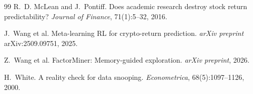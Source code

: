 \documentclass[11pt]{article}
\begin{document}
\begin{thebibliography}{99}
R.~D. McLean and J.~Pontiff.
\newblock Does academic research destroy stock return predictability?
\newblock \emph{Journal of Finance}, 71(1):5--32, 2016.

J.~Wang et al.
\newblock Meta-learning RL for crypto-return prediction.
\newblock \emph{arXiv preprint} arXiv:2509.09751, 2025.

Z.~Wang et al.
\newblock FactorMiner: Memory-guided exploration.
\newblock \emph{arXiv preprint}, 2026.

H.~White.
\newblock A reality check for data snooping.
\newblock \emph{Econometrica}, 68(5):1097--1126, 2000.

\end{thebibliography}
\end{document}
